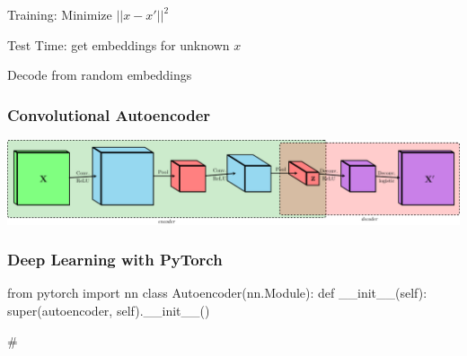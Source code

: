 \documentclass{beamer}
\def\layersep{2.5cm}
\begin{document}
\begin{frame}

\begin{overlayarea}{\linewidth}{.3\textheight}
{
\begin{center}
Training: Minimize $||x-x'||^2$
\end{center}
}
{
\begin{center}
Test Time: get embeddings for unknown $x$
\end{center}
}
{
\begin{center}
Decode from random embeddings
\end{center}
}
\end{overlayarea}
\end{frame} 

\begin{frame}\frametitle{Convolutional Autoencoder}
  \includegraphics[width=\textwidth]{cac.pdf}
\end{frame}





\begin{frame}[fragile]\frametitle{Deep Learning with PyTorch} 
    \begin{pythoncode}
        from pytorch import nn
        class Autoencoder(nn.Module):
            def __init__(self):
                super(autoencoder, self).__init__()

















        #
    \end{pythoncode}
    \vfill
\end{frame}
\end{document}
